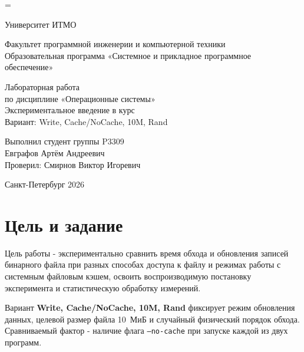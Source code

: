 =
\graphicspath{{analysis/figures/}}
\setlength{\emergencystretch}{2em}
\renewcommand{\arraystretch}{1.2}
\newcommand{\studentgroup}{P3309}
\newcommand{\examiner}{Смирнов Виктор Игоревич}

\newcommand{\ratioRW}{67.65}
\newcommand{\ratioMmap}{1.73}
\newcommand{\ratioCacheMethods}{41.71}


\hypersetup{pageanchor=false}
\begin{titlepage}
\thispagestyle{empty}
\begin{center}
\LARGE Университет ИТМО
\vspace{20pt}

\Large Факультет программной инженерии и компьютерной техники\\
Образовательная программа\linebreak
«Системное и прикладное программное обеспечение»
\vfill

\LARGE Лабораторная работа\\
\Large по дисциплине «Операционные системы»\\[12pt]
Экспериментальное введение в курс\\[12pt]
\normalsize Вариант: Write, Cache/NoCache, 10M, Rand
\vfill
\end{center}
\begin{flushright}
\large Выполнил студент группы \studentgroup\\
Евграфов Артём Андреевич\\[12pt]
Проверил: \examiner
\end{flushright}
\vfill
\begin{center}
\large Санкт-Петербург 2026
\end{center}
\end{titlepage}

\setcounter{page}{1}
\hypersetup{pageanchor=true}
\tableofcontents
\newpage

\section{Цель и задание}
Цель работы - экспериментально сравнить время обхода и обновления
записей бинарного файла при разных способах доступа к файлу и режимах
работы с системным файловым кэшем, освоить
воспроизводимую постановку эксперимента и статистическую обработку
измерений.

Вариант \textbf{Write, Cache/NoCache, 10M, Rand} фиксирует режим
обновления данных, целевой размер файла 10~МиБ и случайный физический
порядок обхода. Сравниваемый фактор - наличие флага
\texttt{--no-cache} при запуске каждой из двух программ.

